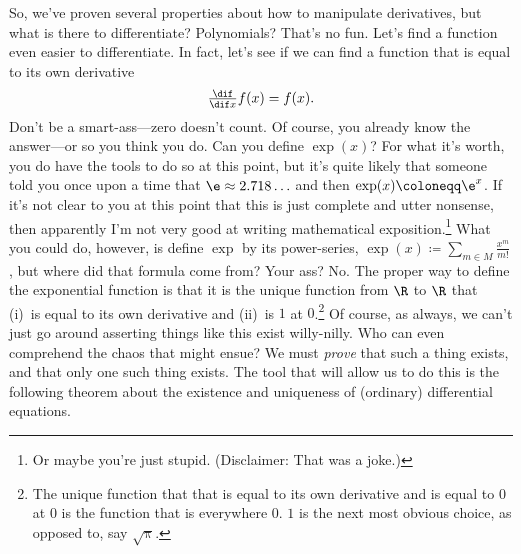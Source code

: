 So, we've proven several properties about how to manipulate derivatives, but what is there to differentiate?  Polynomials?  That's no fun.  Let's find a function even easier to differentiate.  In fact, let's see if we can find a function that is equal to its own derivative
\begin{equation}
\tfrac{\dif}{\dif x}f(x)=f(x).
\end{equation}
Don't be a smart-ass---zero doesn't count.  Of course, you already know the answer---or so you think you do.  Can you define $\exp (x)$?  For what it's worth, you do have the tools to do so at this point, but it's quite likely that someone told you once upon a time that $\e \approx 2.718\ldots $ and then $\exp (x)\coloneqq \e ^x$.  If it's not clear to you at this point that this is just complete and utter nonsense, then apparently I'm not very good at writing mathematical exposition.\footnote{Or maybe you're just stupid.  (Disclaimer:  That was a joke.)}  What you could do, however, is define $\exp$ by its power-series, $\exp (x)\coloneqq \sum _{m\in M}\frac{x^m}{m!}$, but where did that formula come from?  Your ass?  No.  The proper way to define the exponential function is that it is the unique function from $\R$ to $\R$ that (i)~is equal to its own derivative and (ii)~is $1$ at $0$.\footnote{The unique function that that is equal to its own derivative and is equal to $0$ at $0$ is the function that is everywhere $0$.  $1$ is the next most obvious choice, as opposed to, say $\sqrt{\uppi}$.}  Of course, as always, we can't just go around asserting things like this exist willy-nilly.  Who can even comprehend the chaos that might ensue?  We must \emph{prove} that such a thing exists, and that only one such thing exists.  The tool that will allow us to do this is the following theorem about the existence and uniqueness of (ordinary) differential equations.

